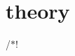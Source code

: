 \chapter{theory }
\hypertarget{md__midterm_01_reviews_2_midterm_010_2theory}{}\label{md__midterm_01_reviews_2_midterm_010_2theory}
/\texorpdfstring{$\ast$}{*}! 